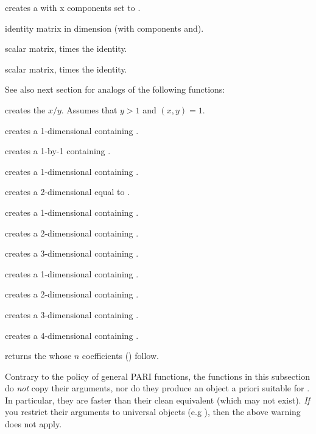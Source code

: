 creates a  with  x
 components set to .

 identity matrix in dimension  (with
components  and).

 scalar matrix,  times the identity.

 scalar matrix,  times
the identity.

\smallskip
See also next section for analogs of the following functions:

 creates the  $x/y$. Assumes that
$y > 1$ and $(x,y) = 1$.

 creates a 1-dimensional  containing
.

 creates a 1-by-1  containing .

 creates a 1-dimensional  containing
.

 creates a 2-dimensional  equal
to \kbd{[x,y]}.

 creates a 1-dimensional 
containing .

 creates a 2-dimensional 
containing .

 creates a 3-dimensional 
containing .

 creates a 1-dimensional 
containing .

 creates a 2-dimensional 
containing \kbd{[x, y]}.

 creates a 3-dimensional
 containing \kbd{[x, y, z]}.

 creates a 4-dimensional
 containing \kbd{[x, y, z, t]}.

 returns the  whose $n$
coefficients () follow.

\label{se:unclean}

Contrary to the policy of general PARI functions, the functions in this
subsection do \emph{not} copy their arguments, nor do they produce an object
a priori suitable for . In particular, they are
faster than their clean equivalent (which may not exist). \emph{If} you
restrict their arguments to universal objects (e.g ),
then the above warning does not apply.

